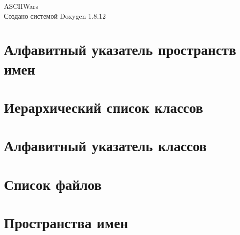 \documentclass[twoside]{book}
\newcommand{\+}{\discretionary{\mbox{\scriptsize$\hookleftarrow$}}{}{}}
\newcommand{\clearemptydoublepage}{%
  \newpage{\pagestyle{empty}\cleardoublepage}%
}
\begin{document}
\hypersetup{pageanchor=false,
             bookmarksnumbered=true,
             pdfencoding=unicode
            }
\begin{titlepage}
\vspace*{7cm}
\begin{center}%
{\Large A\+S\+C\+I\+I\+Wars }\\
\vspace*{1cm}
{\large Создано системой Doxygen 1.8.12}\\
\end{center}
\end{titlepage}
\clearemptydoublepage
{}
\tableofcontents
\clearemptydoublepage
{}
\hypersetup{pageanchor=true}

\chapter{Алфавитный указатель пространств имен}

\chapter{Иерархический список классов}

\chapter{Алфавитный указатель классов}

\chapter{Список файлов}

\chapter{Пространства имен}





\end{document}

